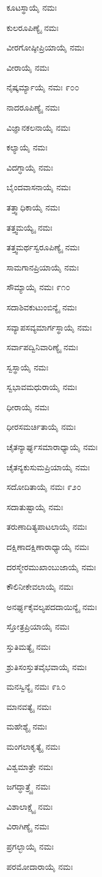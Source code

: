 ಕೂಟಸ್ಥಾಯೈ ನಮಃ

ಕುಲರೂಪಿಣ್ಯೈ ನಮಃ

ವೀರಗೋಷ್ಠೀಪ್ರಿಯಾಯೈ ನಮಃ

ವೀರಾಯೈ ನಮಃ

ನೈಷ್ಕರ್ಮ್ಯಾಯೈ ನಮಃ \num{೯೦೦}

ನಾದರೂಪಿಣ್ಯೈ ನಮಃ

ವಿಜ್ಞಾನಕಲನಾಯೈ ನಮಃ

ಕಲ್ಯಾಯೈ ನಮಃ

ವಿದಗ್ಧಾಯೈ ನಮಃ

ಬೈಂದವಾಸನಾಯೈ ನಮಃ

ತತ್ತ್ವಾಧಿಕಾಯೈ ನಮಃ

ತತ್ತ್ವಮಯ್ಯೈ ನಮಃ

ತತ್ತ್ವಮರ್ಥಸ್ವರೂಪಿಣ್ಯೈ ನಮಃ

ಸಾಮಗಾನಪ್ರಿಯಾಯೈ ನಮಃ

ಸೌಮ್ಯಾಯೈ ನಮಃ \num{೯೧೦}

ಸದಾಶಿವಕುಟುಂಬಿನ್ಯೈ ನಮಃ

ಸವ್ಯಾಪಸವ್ಯಮಾರ್ಗಸ್ಥಾಯೈ ನಮಃ

ಸರ್ವಾಪದ್ವಿನಿವಾರಿಣ್ಯೈ ನಮಃ

ಸ್ವಸ್ಥಾಯೈ ನಮಃ

ಸ್ವಭಾವಮಧುರಾಯೈ ನಮಃ

ಧೀರಾಯೈ ನಮಃ

ಧೀರಸಮರ್ಚಿತಾಯೈ ನಮಃ

ಚೈತನ್ಯಾರ್ಘ್ಯಸಮಾರಾಧ್ಯಾಯೈ ನಮಃ

ಚೈತನ್ಯಕುಸುಮಪ್ರಿಯಾಯೈ ನಮಃ

ಸದೋದಿತಾಯೈ ನಮಃ \num{೯೨೦}

ಸದಾತುಷ್ಟಾಯೈ ನಮಃ

ತರುಣಾದಿತ್ಯಪಾಟಲಾಯೈ ನಮಃ

ದಕ್ಷಿಣಾದಕ್ಷಿಣಾರಾಧ್ಯಾಯೈ ನಮಃ

ದರಸ್ಮೇರಮುಖಾಂಬುಜಾಯೈ ನಮಃ

ಕೌಲಿನೀಕೇವಲಾಯೈ ನಮಃ

ಅನರ್ಘ್ಯಕೈವಲ್ಯಪದದಾಯಿನ್ಯೈ ನಮಃ

ಸ್ತೋತ್ರಪ್ರಿಯಾಯೈ ನಮಃ

ಸ್ತುತಿಮತ್ಯೈ ನಮಃ

ಶ್ರುತಿಸಂಸ್ತುತವೈಭವಾಯೈ ನಮಃ

ಮನಸ್ವಿನ್ಯೈ ನಮಃ \num{೯೩೦}

ಮಾನವತ್ಯೈ ನಮಃ

ಮಹೇಶ್ಯೈ ನಮಃ

ಮಂಗಲಾಕೃತ್ಯೈ ನಮಃ

ವಿಶ್ವಮಾತ್ರೇ ನಮಃ

ಜಗದ್ಧಾತ್ರ್ಯೈ ನಮಃ

ವಿಶಾಲಾಕ್ಷ್ಯೈ ನಮಃ

ವಿರಾಗಿಣ್ಯೈ ನಮಃ

ಪ್ರಗಲ್ಭಾಯೈ ನಮಃ

ಪರಮೋದಾರಾಯೈ ನಮಃ

